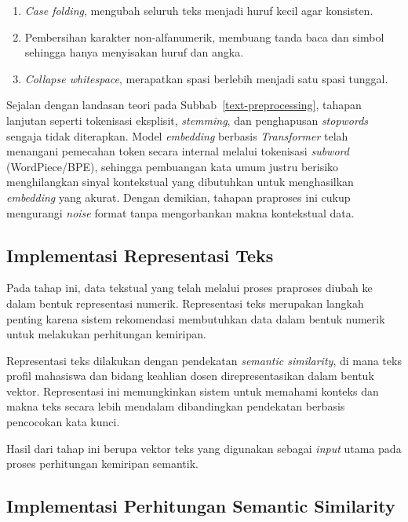 \begin{enumerate}
\def\labelenumi{\arabic{enumi}.}
\item
  \textit{Case folding}, mengubah seluruh teks menjadi huruf kecil agar konsisten.
\item
  Pembersihan karakter non-alfanumerik, membuang tanda baca dan simbol sehingga hanya menyisakan huruf dan angka.
\item
  \textit{Collapse whitespace}, merapatkan spasi berlebih menjadi satu spasi tunggal.
\end{enumerate}

Sejalan dengan landasan teori pada Subbab~\ref{text-preprocessing}, tahapan lanjutan seperti tokenisasi eksplisit, \textit{stemming}, dan penghapusan \textit{stopwords} sengaja tidak diterapkan. Model \textit{embedding} berbasis \textit{Transformer} telah menangani pemecahan token secara internal melalui tokenisasi \textit{subword} (WordPiece/BPE), sehingga pembuangan kata umum justru berisiko menghilangkan sinyal kontekstual yang dibutuhkan untuk menghasilkan \textit{embedding} yang akurat. Dengan demikian, tahapan praproses ini cukup mengurangi \textit{noise} format tanpa mengorbankan makna kontekstual data.

\subsection{Implementasi Representasi Teks}\label{implementasi-representasi-teks}

Pada tahap ini, data tekstual yang telah melalui proses praproses diubah ke dalam bentuk representasi numerik. Representasi teks merupakan langkah penting karena sistem rekomendasi membutuhkan data dalam bentuk numerik untuk melakukan perhitungan kemiripan.

Representasi teks dilakukan dengan pendekatan \textit{semantic similarity}, di mana teks profil mahasiswa dan bidang keahlian dosen direpresentasikan dalam bentuk vektor. Representasi ini memungkinkan sistem untuk memahami konteks dan makna teks secara lebih mendalam dibandingkan pendekatan berbasis pencocokan kata kunci.

Hasil dari tahap ini berupa vektor teks yang digunakan sebagai \textit{input} utama pada proses perhitungan kemiripan semantik.

\subsection{Implementasi Perhitungan Semantic Similarity}\label{implementasi-perhitungan-semantic-similarity}

